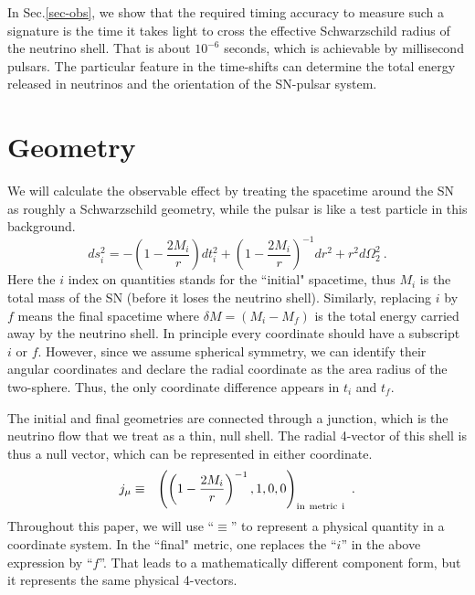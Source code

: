 \documentclass[aps,showpacs,onecolumn,floats,prd,superscriptaddress,nofootinbib]{revtex4}
\begin{document}
In Sec.\ref{sec-obs}, we show that the required timing accuracy to measure such a signature is the time it takes light to cross the effective Schwarzschild radius of the neutrino shell. That is about $10^{-6}$ seconds, which is achievable by millisecond pulsars. The particular feature in the time-shifts can determine the total energy released in neutrinos and the orientation of the SN-pulsar system.

\section{Geometry}
\label{sec-JC}

We will calculate the observable effect by treating the spacetime around the SN as roughly a Schwarzschild geometry, while the pulsar is like a test particle in this background.
\begin{equation}
	ds_i^2 = -\left( 1 -\frac{2M_i}{r}\right) dt_i^2 + \left( 1 -\frac{2M_i}{r} \right)^{-1} dr^2 + r^2 d \Omega_2^2~.	\label{2.1}
\end{equation}
Here the $i$ index on quantities stands for the ``initial" spacetime, thus $M_i$ is the total mass of the SN (before it loses the neutrino shell). Similarly, replacing $i$ by $f$ means the final spacetime where $\delta M = (M_i-M_f)$ is the total energy carried away by the neutrino shell. In principle every coordinate should have a subscript $i$ or $f$. However, since we assume spherical symmetry, we can identify their angular coordinates and declare the radial coordinate as the area radius of the two-sphere. Thus, the only coordinate difference appears in $t_i$ and $t_f$. 

The initial and final geometries are connected through a junction, which is the neutrino flow that we treat as a thin, null shell. The radial 4-vector of this shell is thus a null vector, which can be represented in either coordinate.
\begin{eqnarray}
j_\mu &\equiv& \left( \left(1-\frac{2M_i}{r}\right)^{-1} ,  1 , 0 , 0 \right)_{\rm in \ metric \ i}~.
\end{eqnarray}
Throughout this paper, we will use ``$\equiv$'' to represent a physical quantity in a coordinate system. In the ``final" metric, one replaces the ``$i$'' in the above expression by ``$f$''. That leads to a mathematically different component form, but it represents the same physical 4-vectors.
\end{document}
